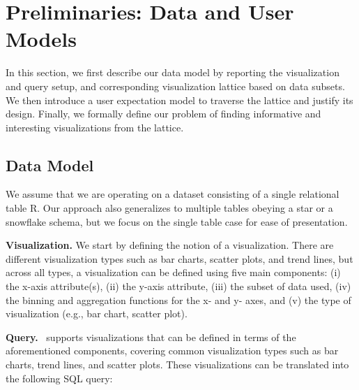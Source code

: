 \section{Preliminaries: Data and User Models} 

In this section, we first describe our data model by reporting the visualization and query setup, and corresponding visualization lattice based on data subsets. We then introduce a user expectation model to traverse the lattice and justify its design. Finally, we formally define our problem of finding informative and interesting visualizations from the lattice.


\subsection{Data Model}
We assume that we are operating on a dataset consisting of a single relational table R. Our approach also generalizes to multiple tables obeying a star or a snowflake schema, but we focus on the single table case for ease of presentation. 


\textbf{Visualization.} We start by defining the notion of a visualization. There are different visualization types such as bar charts, scatter plots, and trend lines, but across all types, a visualization can be defined using five main components: (i) the x-axis attribute(s), (ii) the y-axis attribute, (iii) the subset of data used, (iv) the binning and aggregation functions for the x- and y- axes, and (v) the type of visualization (e.g., bar chart, scatter plot).


\textbf{Query.} \system\ supports visualizations that can be defined in terms of the aforementioned components, covering common visualization types such as bar charts, trend lines, and scatter plots. These visualizations can be translated into the following \textsc{SQL} query: 

